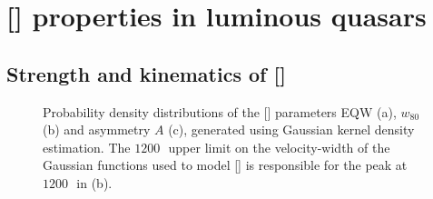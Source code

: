 \section{[] properties in luminous quasars}

\subsection{Strength and kinematics of []}
\label{sec:ch4-basicresults}

\begin{figure}
    \captionsetup[subfigure]{labelformat=empty}
    \centering
    \subfloat[\label{fig:parameter_hists_a}]{}
    \subfloat[\label{fig:parameter_hists_b}]{}
    \subfloat[\label{fig:parameter_hists_c}]{}
    \caption[{Probability density distributions of the [] parameters EQW, $w_{80}$ and asymmetry $A$.}]{Probability density distributions of the [] parameters EQW (a), $w_{80}$ (b) and asymmetry $A$ (c), generated using Gaussian kernel density estimation. The $1200$\,\kms\, upper limit on the velocity-width of the Gaussian functions used to model [] is responsible for the peak at $1200$\,\kms\, in (b).}     
    \label{fig:parameter_hists}
\end{figure}

